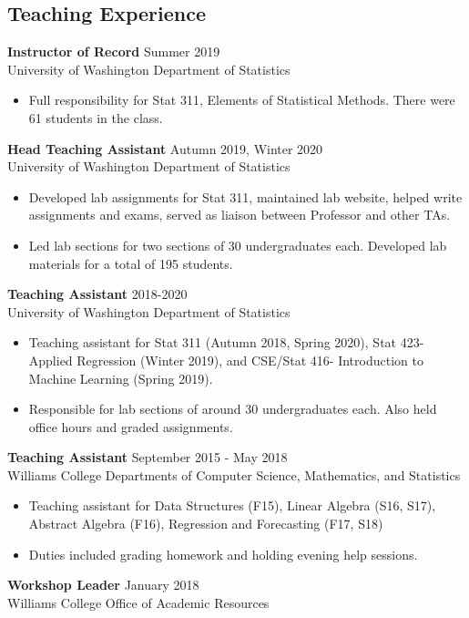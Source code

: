 \documentclass[margin, 10pt]{res} %
\begin{document}
\begin{resume}
{\section{Teaching Experience}
{\textbf{Instructor of Record}} \hfill Summer 2019 \\
University of Washington Department of Statistics
\begin{itemize}
\item Full responsibility for Stat 311, Elements of Statistical Methods. There were 61 students in the class. 
\end{itemize}
{\textbf{Head Teaching Assistant}} \hfill Autumn 2019, Winter 2020 \\
University of Washington Department of Statistics
\begin{itemize}
\item Developed lab assignments for Stat 311, maintained lab website, helped write assignments and exams, served as liaison between Professor and other TAs.  
\item Led lab sections for two sections of 30 undergraduates each. Developed lab materials for a total of 195 students. 
\end{itemize} 
{\textbf{Teaching Assistant}} \hfill 2018-2020\\
University of Washington Department of Statistics
\begin{itemize}
\item Teaching assistant for Stat 311 (Autumn 2018, Spring 2020), Stat 423- Applied Regression (Winter 2019), 
and CSE/Stat 416- Introduction to Machine Learning (Spring 2019). 
\item Responsible for lab sections of around 30 undergraduates each. Also held office hours and graded assignments.
\end{itemize}
{\textbf{Teaching Assistant}} \hfill September 2015 - May 2018 \\
Williams College Departments of Computer Science, Mathematics, and Statistics
\begin{itemize}
\item Teaching assistant for Data Structures (F15), Linear Algebra (S16, S17), Abstract Algebra (F16), Regression and Forecasting (F17, S18)
\item Duties included grading homework and holding evening help sessions. 
\end{itemize}
{\textbf{Workshop Leader}} \hfill January 2018 \\
Williams College Office of Academic Resources
\begin{itemize}

\end{itemize}}
\end{resume}
\end{document}
